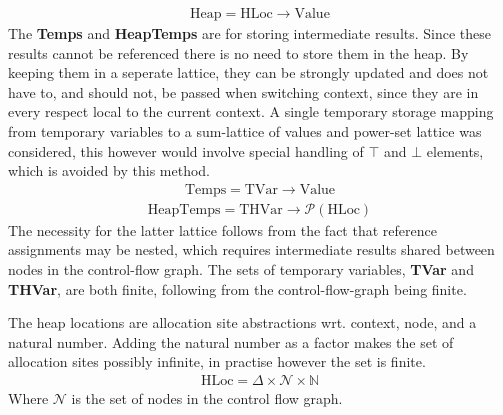 \begin{align}
\text{Heap} = \text{HLoc} \rightarrow \text{Value}
\end{align}
The {\bf Temps} and {\bf HeapTemps} are for storing intermediate results. Since these results cannot be referenced there is no need to store them in the heap. By keeping them in a seperate lattice, they can be strongly updated and does not have to, and should not, be passed when switching context, since they are in every respect local to the current context. A single temporary storage mapping from temporary variables to a sum-lattice of values and power-set lattice was considered, this however would involve special handling of $\top$ and $\bot$ elements, which is avoided by this method. 
\begin{align}
\text{Temps} = \text{TVar} \rightarrow \text{Value}
\end{align}
\begin{align}
\text{HeapTemps} = \text{THVar} \rightarrow \mathcal{P}(\text{HLoc})
\end{align}
The necessity for the latter lattice follows from the fact that reference assignments may be nested, which requires intermediate results shared between nodes in the control-flow graph. The sets of temporary variables, {\bf TVar} and {\bf THVar}, are both finite, following from the control-flow-graph being finite.

The heap locations are allocation site abstractions wrt. context, node, and a natural number. Adding the natural number as a factor makes the set of allocation sites possibly infinite, in practise however the set is finite. 
\begin{align}
\text{HLoc}  = \Delta \times \mathcal{N} \times \mathbb{N}
\end{align}
Where $\mathcal{N}$ is the set of nodes in the control flow graph. 

